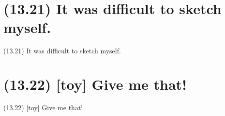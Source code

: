 \documentclass{article}
\begin{document}
\clearpage

%
%

\section*{(13.21) It was difficult to sketch myself.}

\bigbreak
\begin{enumerate*}
\item[(13.21)] It was difficult to sketch myself.
\end{enumerate*}
\bigbreak

\bigbreak
\begin{minipage}{\textwidth}
\end{minipage}
\bigbreak

\clearpage

%
%

\section*{(13.22) [toy] Give me that!}

\bigbreak
\begin{enumerate*}
\item[(13.22)] [toy] Give me that!
\end{enumerate*}
\bigbreak
\end{document}
